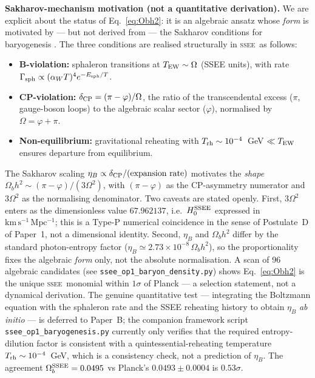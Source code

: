 \documentclass[12pt,a4paper]{article}
\newcommand{\SSEE}{\ifmmode\mathrm{SSEE}\else\textsc{ssee}\fi}
\begin{document}
\textbf{Sakharov-mechanism motivation (not a quantitative derivation).}
We are explicit about the status of Eq.~\eqref{eq:Obh2}: it is an algebraic
ansatz whose \emph{form} is motivated by --- but not derived from --- the
Sakharov conditions for baryogenesis \citep{Sakharov1967}. The three conditions
are realised structurally in \SSEE\ as follows:
\begin{itemize}
  \item \textbf{B-violation:} sphaleron transitions at $T_{\rm EW}\sim\Omega$
    (SSEE units), with rate $\Gamma_{\rm sph} \propto (\alpha_W T)^4 e^{-E_{\rm sph}/T}$.
  \item \textbf{CP-violation:} $\delta_{\rm CP} = (\pi-\varphi)/\Omega$, the ratio of
    the transcendental excess ($\pi$, gauge-boson loops) to the algebraic scalar sector
    ($\varphi$), normalised by $\Omega = \varphi+\pi$.
  \item \textbf{Non-equilibrium:} gravitational reheating with
    $T_{\rm rh}\sim10^{-4}$~GeV $\ll T_{\rm EW}$ ensures departure from equilibrium.
\end{itemize}
The Sakharov scaling $\eta_B \propto \delta_{\rm CP}/(\text{expansion rate})$
motivates the \emph{shape} $\Omega_b h^2 \sim (\pi-\varphi)/(3\Omega^2)$, with
$(\pi-\varphi)$ as the CP-asymmetry numerator and $3\Omega^2$ as the
normalising denominator. Two caveats are stated openly. First, $3\Omega^2$
enters as the dimensionless value $67.962137$, i.e.\ $H_0^{\rm SSEE}$ expressed in
$\mathrm{km\,s^{-1}\,Mpc^{-1}}$; this is a Type-P numerical coincidence in the
sense of Postulate~D of Paper~1, not a dimensional identity. Second,
$\eta_B$ and $\Omega_b h^2$ differ by the standard photon-entropy factor
($\eta_B \simeq 2.73\times10^{-8}\,\Omega_b h^2$), so the proportionality fixes
the algebraic \emph{form} only, not the absolute normalisation.
A scan of 96 algebraic candidates (see \texttt{ssee\_op1\_baryon\_density.py})
shows Eq.~\eqref{eq:Obh2} is the unique \SSEE\ monomial within $1\sigma$ of
Planck --- a selection statement, not a dynamical derivation.
The genuine quantitative test --- integrating the Boltzmann equation with the
sphaleron rate and the SSEE reheating history to obtain $\eta_B$
\emph{ab initio} --- is deferred to Paper~B; the companion framework script
\texttt{ssee\_op1\_baryogenesis.py} currently only verifies that the required
entropy-dilution factor is consistent with a quintessential-reheating
temperature $T_{\rm rh}\sim10^{-4}$~GeV, which is a consistency check, not a
prediction of $\eta_B$.
The agreement $\Omega_b^{\rm SSEE} = 0.0495$ vs Planck's $0.0493\pm0.0004$ is $0.53\sigma$.
\end{document}
